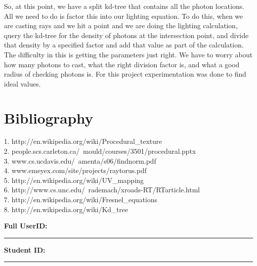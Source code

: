 \documentclass {article}
\begin{document}
So, at this point, we have a split kd-tree that contains all the photon
locations.  All we need to do is factor this into our lighting equation.  To do
this, when we are casting rays and we hit a point and we are doing the lighting
calculation, query the kd-tree for the density of photons at the intersection
point, and divide that density by a specified factor and add that value as part
of the calculation.\\

The difficulty in this is getting the parameters just right.  We have to worry
about how many photons to cast, what the right division factor is, and what a
good radius of checking photons is.  For this project experimentation was done
to find ideal values.\\

\section{Bibliography}
        1. http://en.wikipedia.org/wiki/Procedural\_texture\\
        2. people.scs.carleton.ca/~mould/courses/3501/procedural.pptx\\
        3. www.cs.ucdavis.edu/~amenta/s06/findnorm.pdf\\
        4. www.emeyex.com/site/projects/raytorus.pdf\\
        5. http://en.wikipedia.org/wiki/UV\_mapping\\
        6. http://www.cs.unc.edu/~rademach/xroads-RT/RTarticle.html\\
        7. http://en.wikipedia.org/wiki/Fresnel\_equations\\
        8. http://en.wikipedia.org/wiki/Kd\_tree\\

\newpage



{\hfill{\bf Full UserID:\rule{2in}{.1mm}}\hfill{\bf Student ID:\rule{2in}{.1mm}}\hfill}
\end{document}
